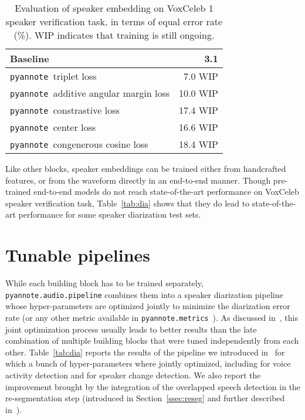 \documentclass{article}
\def\pyannote{{\small\texttt{pyannote}}}
\begin{document}
\begin{table}[]
    \centering
    \begin{tabular}{|l|r|}
        \hline
        Baseline & 3.1 \cite{x-vector} \\
        \hline
        \pyannote~triplet loss & 7.0 {\scriptsize{WIP}} \\
        \pyannote~additive angular margin loss & 10.0 {\scriptsize{WIP}} \\
        \pyannote~constrastive loss & 17.4 {\scriptsize{WIP}} \\
        \pyannote~center loss & 16.6 {\scriptsize{WIP}} \\
        \pyannote~congenerous cosine loss& 18.4 {\scriptsize{WIP}} \\
        \hline
    \end{tabular}
    \caption{Evaluation of speaker embedding on VoxCeleb 1 speaker verification task, in terms of equal error rate (\%). {\scriptsize{WIP}} indicates that training is still ongoing.}
    \label{tab:emb}
\end{table}

Like other blocks, speaker embeddings can be trained either from handcrafted features, or from the waveform directly in an end-to-end manner. Though pre-trained end-to-end models do not reach state-of-the-art performance on VoxCeleb speaker verification task, Table~\ref{tab:dia} shows that they do lead to state-of-the-art performance for some speaker diarization test sets.

\vspace{-0.17cm}
\section{Tunable pipelines}
\label{sec:pipeline}

While each building block has to be trained separately, {\small \texttt{pyannote.audio.pipeline}} combines them into a speaker diarization pipeline whose hyper-parameters are optimized jointly to minimize the diarization error rate (or any other metric available in {\small \texttt{pyannote.metrics}}~\cite{pyannote.metrics}). As discussed in~\cite{Yin2018}, this joint optimization process usually leads to better results than the late combination of multiple building blocks that were tuned independently from each other. Table~\ref{tab:dia} reports the results of the pipeline we introduced in~\cite{Yin2018} for which a bunch of hyper-parameters where jointly optimized, including  for voice activity detection and  for speaker change detection. We also report the improvement brought by the integration of the overlapped speech detection in the re-segmentation step (introduced in Section~\ref{ssec:reseg} and further described in~\cite{Bullock2020}).
\end{document}
